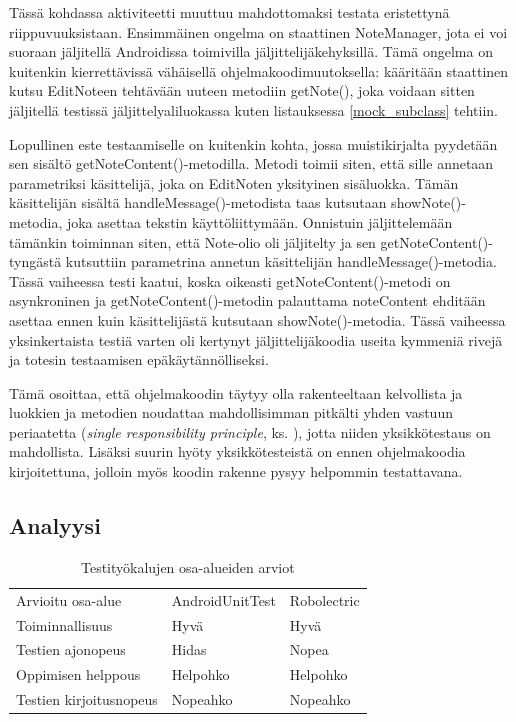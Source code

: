 Tässä kohdassa aktiviteetti muuttuu mahdottomaksi testata eristettynä riippuvuuksistaan. Ensimmäinen ongelma on staattinen NoteManager, jota ei voi suoraan jäljitellä Androidissa toimivilla jäljittelijäkehyksillä. Tämä ongelma on kuitenkin kierrettävissä vähäisellä ohjelmakoodimuutoksella: kääritään staattinen kutsu EditNoteen tehtävään uuteen metodiin getNote(), joka voidaan sitten jäljitellä testissä jäljittelyaliluokassa kuten listauksessa \ref{mock_subclass} tehtiin.

Lopullinen este testaamiselle on kuitenkin kohta, jossa muistikirjalta pyydetään sen sisältö getNoteContent()-metodilla. Metodi toimii siten, että sille annetaan parametriksi käsittelijä, joka on EditNoten yksityinen sisäluokka. Tämän käsittelijän sisältä handleMessage()-metodista taas kutsutaan showNote()-metodia, joka asettaa tekstin käyttöliittymään. Onnistuin jäljittelemään tämänkin toiminnan siten, että Note-olio oli jäljitelty ja sen getNoteContent()-tyngästä kutsuttiin parametrina annetun käsittelijän handleMessage()-metodia. Tässä vaiheessa testi kaatui, koska oikeasti getNoteContent()-metodi on asynkroninen ja getNoteContent()-metodin palauttama noteContent ehditään asettaa ennen kuin käsittelijästä kutsutaan showNote()-metodia. Tässä vaiheessa yksinkertaista testiä varten oli kertynyt jäljittelijäkoodia useita kymmeniä rivejä ja totesin testaamisen epäkäytännölliseksi.

Tämä osoittaa, että ohjelmakoodin täytyy olla rakenteeltaan kelvollista ja luokkien ja metodien noudattaa mahdollisimman pitkälti yhden vastuun periaatetta (\emph{single responsibility principle}, ks. \cite[95-98]{agile_development}), jotta niiden yksikkötestaus on mahdollista. Lisäksi suurin hyöty yksikkötesteistä on ennen ohjelmakoodia kirjoitettuna, jolloin myös koodin rakenne pysyy helpommin testattavana.

\subsection{Analyysi}

\begin{table}[h]
\centering
\begin{tabular}{ l l l }
  Arvioitu osa-alue & AndroidUnitTest & Robolectric \\
  Toiminnallisuus & Hyvä & Hyvä \\
  Testien ajonopeus & Hidas & Nopea \\
  Oppimisen helppous & Helpohko & Helpohko \\
  Testien kirjoitusnopeus & Nopeahko & Nopeahko \\
\end{tabular}
\caption{Testityökalujen osa-alueiden arviot}
\label{unittest_evaluation}
\end{table}

